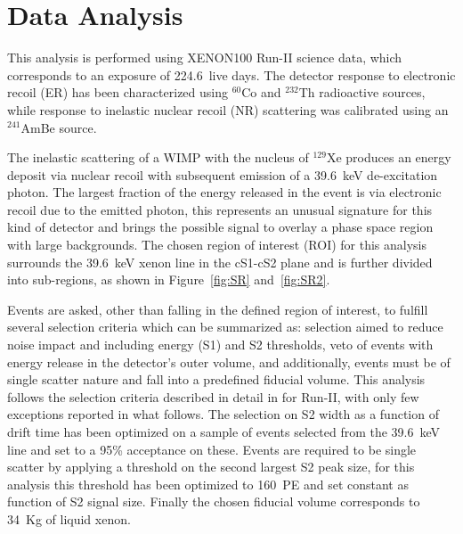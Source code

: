 \section{Data Analysis}

This analysis is performed using XENON100 Run-II science data, which corresponds to an exposure of 224.6~live days. The detector response to
electronic recoil (ER) has been characterized using $^{60}$Co and $^{232}$Th radioactive sources, while response to inelastic nuclear recoil (NR)
scattering was calibrated using an $^{241}$AmBe source. 

The inelastic scattering of a WIMP with the nucleus of $^{129}$Xe produces an energy deposit via nuclear recoil with subsequent emission of  
a 39.6~keV de-excitation photon. 
The largest fraction of the energy released in the event is via electronic recoil due to the emitted photon, this represents an
unusual signature for this kind of detector and brings the possible signal to overlay a phase space region with large backgrounds.
The chosen region of interest (ROI) for this analysis surrounds the 39.6~keV xenon line in the cS1-cS2 plane and is further divided into
sub-regions, as shown in Figure~\ref{fig:SR} and~\ref{fig:SR2}.

Events are asked, other than falling in the defined region of interest, to fulfill several selection criteria which can be summarized as:
selection aimed to reduce noise impact and including energy (S1) and S2 thresholds, veto of events with energy release in the detector's outer volume, 
and additionally, events must be of single scatter nature and fall into a predefined fiducial volume. This analysis follows the 
selection criteria described in detail in \cite{dataAnalysis} for Run-II, with only few exceptions reported in what follows. 
The selection on S2 width as a function of drift time has been optimized on a sample of events selected from the 39.6~keV line
and set to a 95\% acceptance on these. Events are required to be single scatter by applying a threshold on the 
second largest S2 peak size,  for this analysis this threshold has been optimized to 160~PE and set constant as function of S2 signal size. 
Finally the chosen fiducial volume corresponds to 34~Kg of liquid xenon.


